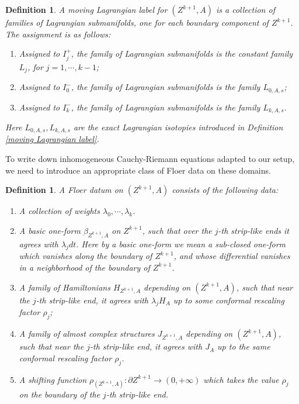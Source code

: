 \documentclass{amsart}
\newtheorem{definition}[theorem]{Definition}
\numberwithin{equation}{section}
\numberwithin{figure}{section}
\begin{document}
\begin{definition}
	A moving Lagrangian label for $(Z^{k+1}, A)$ is a collection of families of Lagrangian submanifolds, one for each boundary component of $Z^{k+1}$. The assignment is as follows:
\begin{enumerate}[label=(\roman*)]

\item Assigned to $I^{+}_{j}$, the family of Lagrangian submanifolds is the constant family $L_{j}$, for $j = 1, \cdots, k-1$;

\item Assigned to $I^{-}_{0}$, the family of Lagrangian submanifolds is the family $L_{0, A, s}$;

\item Assigned to $I^{-}_{k}$, the family of Lagrangian submanifolds is the family $L_{k, A, s}$.

\end{enumerate}
Here $L_{0, A, s}, L_{k, A, s}$ are the exact Lagrangian isotopies introduced in Definition \ref{moving Lagrangian label}.
\end{definition}

	To write down inhomogeneous Cauchy-Riemann equations adapted to our setup, we need to introduce an appropriate class of Floer data on these domains. \par

\begin{definition}
	A Floer datum on $(Z^{k+1}, A)$ consists of the following data:
\begin{enumerate}[label=(\roman*)]

\item A collection of weights $\lambda_{0}, \cdots, \lambda_{k}$.

\item A basic one-form $\beta_{Z^{k+1}, A}$ on $Z^{k+1}$, such that over the $j$-th strip-like ends it agrees with $\lambda_{j} dt$. Here by a basic one-form we mean a sub-closed one-form which vanishes along the boundary of $Z^{k+1}$, and whose differential vanishes in a neighborhood of the boundary of $Z^{k+1}$.

\item A family of Hamiltonians $H_{Z^{k+1}, A}$ depending on $(Z^{k+1}, A)$, such that near the $j$-th strip-like end, it agrees with $\lambda_{j}H_{A}$ up to some conformal rescaling factor $\rho_{j}$;

\item A family of almost complex structures $J_{Z^{k+1}, A}$ depending on $(Z^{k+1}, A)$, such that near the $j$-th strip-like end, it agrees with $J_{A}$ up to the same conformal rescaling factor $\rho_{j}$.

\item A shifting function $\rho_{(Z^{k+1}, A)}: \partial Z^{k+1} \to (0, +\infty)$ which takes the value $\rho_{j}$ on the boundary of the $j$-th strip-like end.

\end{enumerate}
\end{definition}
\end{document}
